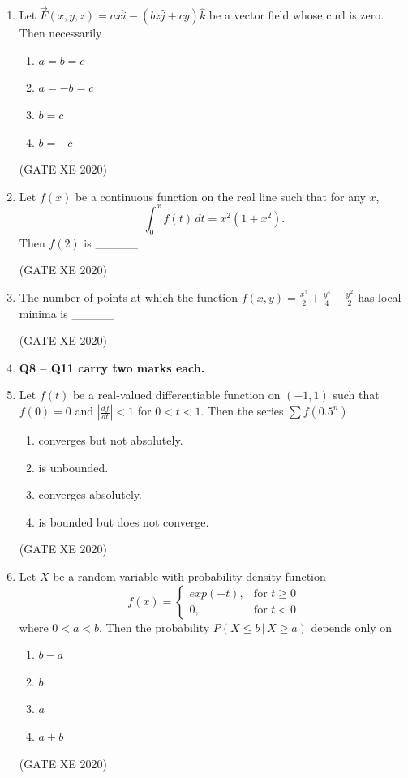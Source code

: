 \documentclass[12pt]{article}
\begin{document}
\begin{enumerate}
\item Let $\vec{F}(x,y,z)=ax\hat{i}-(bz\hat{j}+cy)\hat{k}$ be a vector field whose curl is zero. Then necessarily
  \begin{enumerate}
    \item $a=b=c$
    \item $a=-b=c$
    \item $b=c$
    \item $b=-c$
  \end{enumerate}
  (GATE XE 2020)

\item Let $f(x)$ be a continuous function on the real line such that for any $x$, 
  $$\int_{0}^{x} f(t) \, dt = x^2 (1+x^2).$$
  Then $f(2)$ is \_\_\_\_\_

  (GATE XE 2020)

\item The number of points at which the function $f(x,y) = \frac{x^2}{2} + \frac{y^4}{4} - \frac{y^2}{2}$ has local minima is \_\_\_\_\_

  (GATE XE 2020)


\item[] \textbf {Q8 -- Q11 carry two marks each.}



\item Let $f(t)$ be a real-valued differentiable function on $(-1,1)$ such that $f(0)=0$ and $\left| \frac{df}{dt} \right| < 1$ for $0 < t < 1$. Then the series $\sum f(0.5^n)$
  \begin{enumerate}
    \item converges but not absolutely.
    \item is unbounded.
    \item converges absolutely.
    \item is bounded but does not converge.
  \end{enumerate}
  (GATE XE 2020)

\item Let $X$ be a random variable with probability density function
  $$
  f(x) = \begin{cases}
  exp(-t),&  \text{for } t\geq0 \\
  0, & \text{for } t< 0
  \end{cases}
  $$
  where $0 < a < b$. Then the probability $P(X \leq b \, | \, X \geq a)$ depends only on
  \begin{enumerate}
    \item $b-a$
    \item $b$
    \item $a$
    \item $a+b$
  \end{enumerate}
  (GATE XE 2020)


\end{enumerate}
\end{document}
